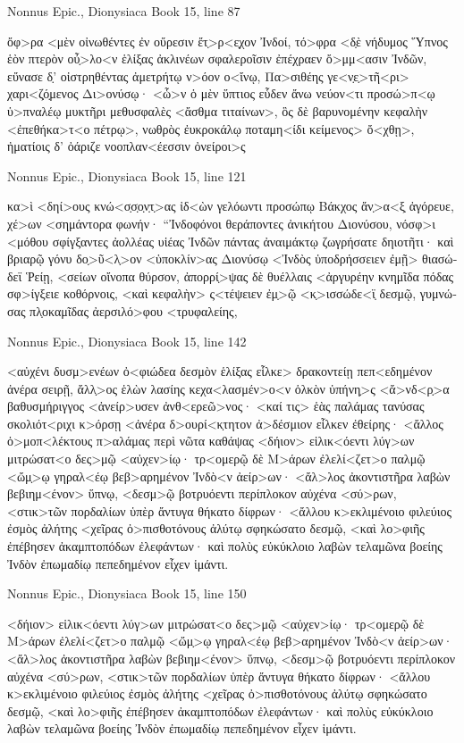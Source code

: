 \documentclass[12pt,letterpaper,twoside,final]{memoir}
\begin{document}
\begin{greek}
Nonnus Epic., Dionysiaca 
Book 15, line 87

ὄφ>ρα <μὲν οἰνωθέντες ἐν οὔρεσιν ἔτ̣>ρ<ε̣χον Ἰνδοί, 
τό>φρα <δ̣ὲ νήδυμος Ὕπνος ἑὸν πτερὸν οὖ̣>λο<ν ἑλίξας 
ἀκλινέων σφαλεροῖσιν ἐπέχραεν ὄ>μμ<ασιν Ἰνδῶν, 
εὔνασε δ̣' οἰστρηθέντας ἀμετρήτῳ ν>όον ο<ἴνῳ, 
Πα>σιθέης γε<ν̣ε̣>τῆ<ρι> χαρι<ζ̣ό̣μενος Δι>ονύσῳ· 
<ὧ>ν ὁ μὲν ὕπτιος εὗδεν ἄνω νεύον<τι προσώ>π<ῳ 
ὑ>πναλέῳ μυκτῆρι μεθυσφαλὲς <ἄσθμα τιταίνων>,   
ὃς δὲ βαρυνομένην κεφαλὴν <ἐπεθήκα>τ<ο πέτρῳ>, 
νωθρὸς ἐυκροκάλῳ ποταμη<ίδι κείμενος> ὄ<χθῃ>, 
ἠματίοις δ' ὀάριζε νοοπλαν<έεσσιν ὀνείροι>ς 




Nonnus Epic., Dionysiaca 
Book 15, line 121

κα>ὶ <δηί>ους κνώ<σ̣σ̣ο̣ν̣τ̣>ας ἰδ<ὼν γελόωντι προσώπῳ 
Βάκχος ἄν̣>α<ξ̣ ἀγόρευε, χέ>ων <σημάντορα φωνήν· 
 “Ἰνδοφόνοι θεράποντες ἀνικήτου Διονύσου, 
νόσφ>ι <μόθου σφίγξαντες ἀολλέας υἱέας Ἰνδῶν 
πάντας ἀναιμάκτῳ ζωγρήσατε δηιοτῆτι· 
καὶ βριαρῷ γόνυ δο̣>ῦ<λ̣>ον <ὑποκλίν>ας Διονύσῳ 
<Ἰνδὸς ὑποδρήσσειεν ἐμῇ> θιασώδεϊ Ῥείῃ, 
<σείων οἴνοπα θύρσον, ἀπορρί̣>ψας δὲ θυέλλαις 
<ἀργυρέην κνημῖδα πόδας σφ>ίγξειε κοθόρνοις, 
<καὶ κεφαλὴν> ς<τέψειεν ἐμ̣>ῷ <κ̣>ισσώδε<ϊ̣ δεσμῷ, 
γυμνώσας πλ̣οκαμῖδας ἀερσιλό>φου <τρυφαλείης, 




Nonnus Epic., Dionysiaca 
Book 15, line 142

<αὐχένι δυσμ>ενέων ὀ<φιώδεα δεσμὸν ἑλίξας   
εἷλκε> δρακοντείῃ πεπ<εδημένον ἀνέρα σειρῇ, 
ἄλλ̣>ος ἑλὼν λασίης κεχα<λασμέν>ο<ν ὁλκὸν ὑπήνη̣>ς 
<ἄ>νδ<ρ̣>α βαθυσμήριγγος <ἀνείρ>υσεν ἀνθ<ερεῶ>νος· 
<καί τις> ἑὰς παλάμας τανύσας σκολιότ<ριχι κ>όρσῃ 
<ἀνέρα δ>ουρί<κ̣τητον ἀ>δέσμιον εἷλκεν ἐθείρης· 
<ἄλλος ὁ>μοπ<λέκτους π>αλάμας περὶ νῶτα καθάψας 
<δήιον> εἱλικ<όεντι λύγ>ων μιτρώσατ<ο δες>μῷ 
<αὐχεν>ίῳ· τρ<ομερῷ δὲ Μ>άρων ἐλελί<ζετ>ο παλμῷ 
<ὤμ̣>ῳ γηραλ<έῳ βεβ>αρημένον Ἰνδὸ<ν ἀείρ>ων· 
<ἄλ>λος ἀκοντιστῆρα λαβὼν βεβιημ<ένον> ὕπνῳ, 
<δεσμ>ῷ βοτρυόεντι περίπλοκον αὐχένα <σύ>ρων, 
<στικ>τῶν πορδαλίων ὑπὲρ ἄντυγα θήκατο δίφρων· 
<ἄλλου κ>εκλιμένοιο φιλεύιος ἐσμὸς ἀλήτης 
<χεῖρας ὀ>πισθοτόνους ἀλύτῳ σφηκώσατο δεσμῷ, 
<καὶ λο>φιῆς ἐπέβησεν ἀκαμπτοπόδων ἐλεφάντων· 
καὶ πολὺς εὐκύκλοιο λαβὼν τελαμῶνα βοείης   
Ἰνδὸν ἐπωμαδίῳ πεπεδημένον εἶχεν ἱμάντι. 



Nonnus Epic., Dionysiaca 
Book 15, line 150

<δήιον> εἱλικ<όεντι λύγ>ων μιτρώσατ<ο δες>μῷ 
<αὐχεν>ίῳ· τρ<ομερῷ δὲ Μ>άρων ἐλελί<ζετ>ο παλμῷ 
<ὤμ̣>ῳ γηραλ<έῳ βεβ>αρημένον Ἰνδὸ<ν ἀείρ>ων· 
<ἄλ>λος ἀκοντιστῆρα λαβὼν βεβιημ<ένον> ὕπνῳ, 
<δεσμ>ῷ βοτρυόεντι περίπλοκον αὐχένα <σύ>ρων, 
<στικ>τῶν πορδαλίων ὑπὲρ ἄντυγα θήκατο δίφρων· 
<ἄλλου κ>εκλιμένοιο φιλεύιος ἐσμὸς ἀλήτης 
<χεῖρας ὀ>πισθοτόνους ἀλύτῳ σφηκώσατο δεσμῷ, 
<καὶ λο>φιῆς ἐπέβησεν ἀκαμπτοπόδων ἐλεφάντων· 
καὶ πολὺς εὐκύκλοιο λαβὼν τελαμῶνα βοείης   
Ἰνδὸν ἐπωμαδίῳ πεπεδημένον εἶχεν ἱμάντι. 




\end{greek}
\end{document}
